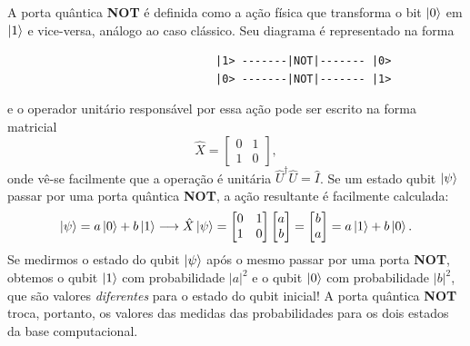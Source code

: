 \documentclass{article}
\begin{document}
A porta quântica \textbf{NOT} é definida como a ação física que transforma o bit $\ket{0}$ em $\ket{1}$ e vice-versa, análogo ao caso clássico. Seu diagrama é representado na forma
\begin{center}
    \begin{verbatim}
                                |1> -------|NOT|------- |0> 
                                |0> -------|NOT|------- |1>                                 
    \end{verbatim}
\end{center}
e o operador unitário responsável por essa ação pode ser escrito na forma matricial 
\begin{equation}
    \hat{X} = \begin{bmatrix}
    0 & 1\\
    1 & 0
    \end{bmatrix},
\end{equation}
onde vê-se facilmente que a operação é unitária $\hat{U}^\dagger \hat{U} = \hat{I}$. Se um estado qubit $\ket{\psi}$ passar por uma porta quântica \textbf{NOT}, a ação resultante é facilmente calculada:
\begin{equation}
    \ket{\psi} = a\ket{0} + b\ket{1} \longrightarrow \hat{X}\ket{\psi} = 
    \begin{bmatrix}
    0 & 1\\
    1 & 0
    \end{bmatrix}
    \begin{bmatrix}
    a\\
    b
    \end{bmatrix} = 
    \begin{bmatrix}
    b\\
    a
    \end{bmatrix} = a\ket{1} + b\ket{0}.
\end{equation}
Se medirmos o estado do qubit $\ket{\psi}$ após o mesmo passar por uma porta \textbf{NOT}, obtemos o qubit $\ket{1}$ com probabilidade $|a|^2$ e o qubit $\ket{0}$ com probabilidade $|b|^2$, que são valores \textit{diferentes} para o estado do qubit inicial! A porta quântica \textbf{NOT} troca, portanto, os valores das medidas das probabilidades para os dois estados da base computacional.
\end{document}
